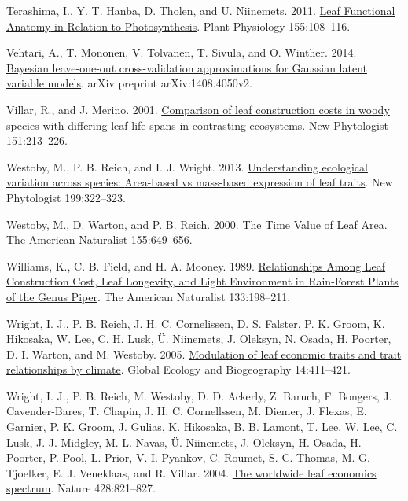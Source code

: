 \documentclass[
  12pt,
]{article}
\newlength{\cslhangindent} %
\newlength{\cslentryspacingunit} %
\newenvironment{CSLReferences}[2] %
 {%
  \setlength{\parindent}{0pt} %
  \ifodd #1 %
  \let\oldpar\par %
  \def\par{\hangindent=\cslhangindent\oldpar} %
  \fi %
  \setlength{\parskip}{#2\cslentryspacingunit} %
 }%
 {} %
\begin{document}
\begin{CSLReferences}{1}{0}
\leavevmode{}%
Terashima, I., Y. T. Hanba, D. Tholen, and U. Niinemets. 2011. \href{https://doi.org/10.1104/pp.110.165472}{Leaf {Functional Anatomy} in {Relation} to {Photosynthesis}}. Plant Physiology 155:108--116.

\leavevmode{}%
Vehtari, A., T. Mononen, V. Tolvanen, T. Sivula, and O. Winther. 2014. \href{https://arxiv.org/abs/1408.4050v2}{Bayesian leave-one-out cross-validation approximations for {Gaussian} latent variable models}. arXiv preprint arXiv:1408.4050v2.

\leavevmode{}%
Villar, R., and J. Merino. 2001. \href{https://doi.org/10.1046/j.1469-8137.2001.00147.x}{Comparison of leaf construction costs in woody species with differing leaf life-spans in contrasting ecosystems}. New Phytologist 151:213--226.

\leavevmode{}%
Westoby, M., P. B. Reich, and I. J. Wright. 2013. \href{https://doi.org/10.1111/nph.12345}{Understanding ecological variation across species: {Area}-based vs mass-based expression of leaf traits}. New Phytologist 199:322--323.

\leavevmode{}%
Westoby, M., D. Warton, and P. B. Reich. 2000. \href{https://doi.org/10.1086/303346}{The {Time Value} of {Leaf Area}}. The American Naturalist 155:649--656.

\leavevmode{}%
Williams, K., C. B. Field, and H. A. Mooney. 1989. \href{https://doi.org/10.1086/284910}{Relationships {Among Leaf Construction Cost}, {Leaf Longevity}, and {Light Environment} in {Rain}-{Forest Plants} of the {Genus Piper}}. The American Naturalist 133:198--211.

\leavevmode{}%
Wright, I. J., P. B. Reich, J. H. C. Cornelissen, D. S. Falster, P. K. Groom, K. Hikosaka, W. Lee, C. H. Lusk, Ü. Niinemets, J. Oleksyn, N. Osada, H. Poorter, D. I. Warton, and M. Westoby. 2005. \href{https://doi.org/10.1111/j.1466-822x.2005.00172.x}{Modulation of leaf economic traits and trait relationships by climate}. Global Ecology and Biogeography 14:411--421.

\leavevmode{}%
Wright, I. J., P. B. Reich, M. Westoby, D. D. Ackerly, Z. Baruch, F. Bongers, J. Cavender-Bares, T. Chapin, J. H. C. Cornellssen, M. Diemer, J. Flexas, E. Garnier, P. K. Groom, J. Gulias, K. Hikosaka, B. B. Lamont, T. Lee, W. Lee, C. Lusk, J. J. Midgley, M. L. Navas, Ü. Niinemets, J. Oleksyn, H. Osada, H. Poorter, P. Pool, L. Prior, V. I. Pyankov, C. Roumet, S. C. Thomas, M. G. Tjoelker, E. J. Veneklaas, and R. Villar. 2004. \href{https://doi.org/10.1038/nature02403}{The worldwide leaf economics spectrum}. Nature 428:821--827.


\end{CSLReferences}
\end{document}
